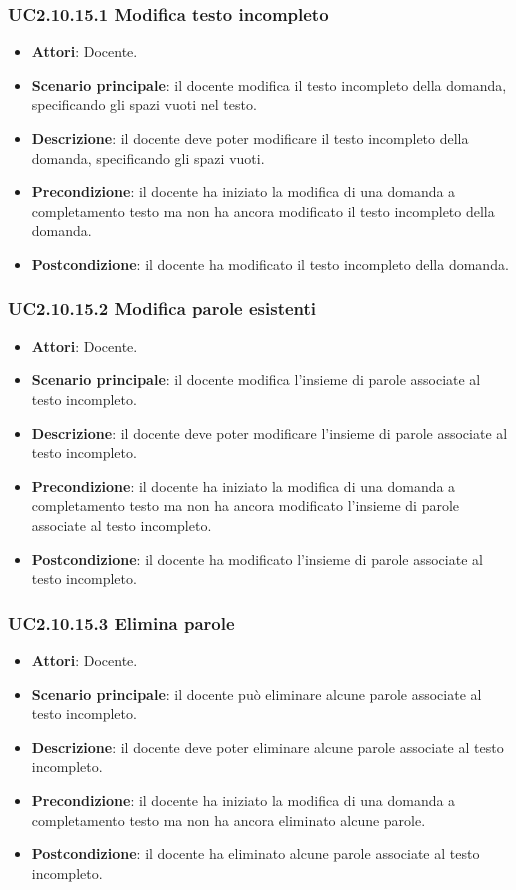 \subsubsection{UC2.10.15.1 Modifica testo incompleto}
\begin{itemize}
\item \textbf{Attori}: Docente.
\item \textbf{Scenario principale}: il docente modifica il testo incompleto della domanda, specificando gli spazi vuoti nel testo.
\item \textbf{Descrizione}: il docente deve poter modificare il testo incompleto della domanda, specificando gli spazi vuoti.
\item \textbf{Precondizione}: il docente ha iniziato la modifica di una domanda a completamento testo ma non ha ancora modificato il testo incompleto della domanda.
\item \textbf{Postcondizione}: il docente ha modificato il testo incompleto della domanda.
\end{itemize}
\subsubsection{UC2.10.15.2 Modifica parole esistenti}
\begin{itemize}
\item \textbf{Attori}: Docente.
\item \textbf{Scenario principale}: il docente modifica l'insieme di parole associate al testo incompleto.
\item \textbf{Descrizione}: il docente deve poter modificare l'insieme di parole associate al testo incompleto.
\item \textbf{Precondizione}: il docente ha iniziato la modifica di una domanda a completamento testo ma non ha ancora modificato l'insieme di parole associate al testo incompleto.
\item \textbf{Postcondizione}: il docente ha modificato l'insieme di parole associate al testo incompleto.
\end{itemize}
\subsubsection{UC2.10.15.3 Elimina parole}
\begin{itemize}
\item \textbf{Attori}: Docente.
\item \textbf{Scenario principale}: il docente può eliminare alcune parole associate al testo incompleto.
\item \textbf{Descrizione}: il docente deve poter eliminare alcune parole associate al testo incompleto.
\item \textbf{Precondizione}: il docente ha iniziato la modifica di una domanda a completamento testo ma non ha ancora eliminato alcune parole.
\item \textbf{Postcondizione}: il docente ha eliminato alcune parole associate al testo incompleto.
\end{itemize}
